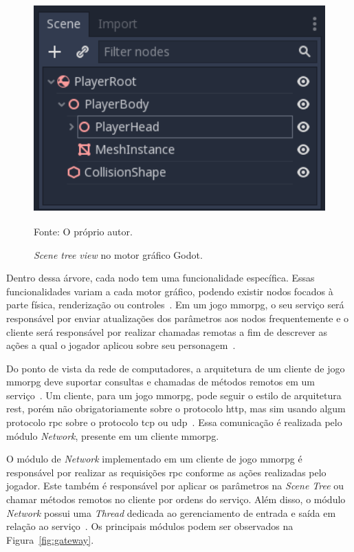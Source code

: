 \begin{figure}[htb!]
\caption{\textit{Scene tree view} no motor gráfico Godot.}
\label{fig:scene_tree}
\includegraphics[height=8cm]{img/cap2/scene_tree.png}
\centering

Fonte: O próprio autor.
\end{figure}



Dentro dessa árvore, cada nodo tem uma funcionalidade específica.
%
Essas funcionalidades variam a cada motor gráfico, podendo existir nodos focados à parte física, renderização ou controles~\cite{godot_docs}.
%
Em um jogo \ac{mmorpg}, o seu serviço será responsável por enviar atualizações dos parâmetros aos nodos frequentemente e o cliente será responsável por realizar chamadas remotas a fim de descrever as ações a qual o jogador aplicou sobre seu personagem~\cite{photon_engine}.


Do ponto de vista da rede de computadores, a arquitetura de um cliente de jogo \ac{mmorpg} deve suportar consultas e chamadas de métodos remotos em um serviço~\cite{albion_online_unite}.
%
Um cliente, para um jogo \ac{mmorpg}, pode seguir o estilo de arquitetura \ac{rest}, porém não obrigatoriamente sobre o protocolo \ac{http}, mas sim usando algum protocolo \ac{rpc} sobre o protocolo \ac{tcp} ou \ac{udp}~\cite{albion_online_unite, stephenclarkewillson2017}.
%
Essa comunicação é realizada pelo módulo \textit{Network}, presente em um cliente \ac{mmorpg}.


O módulo de \textit{Network} implementado em um cliente de jogo \ac{mmorpg} é responsável por realizar as requisições \ac{rpc} conforme as ações realizadas pelo jogador.
%
Este também é responsável por aplicar os parâmetros na \textit{Scene Tree} ou chamar métodos remotos no cliente por ordens do serviço.
%
Além disso, o módulo \textit{Network} possui uma \textit{Thread} dedicada ao gerenciamento de entrada e saída em relação ao serviço~\cite{albion_online_unite}.
%
Os principais módulos podem ser observados na Figura~\ref{fig:gateway}.



